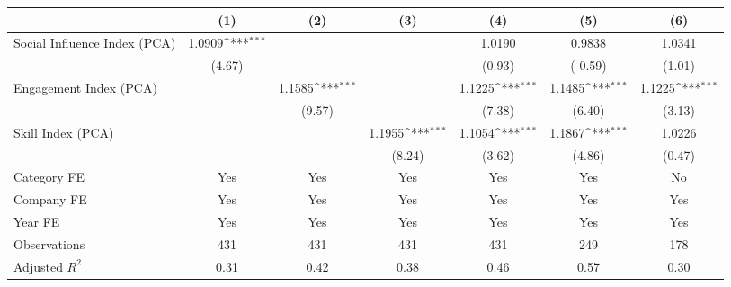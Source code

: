 {
\def\sym#1{\ifmmode^{#1}\else\(^{#1}\)\fi}
\begin{tabular}{l*{6}{c}}
\hline\hline
                                   &\multicolumn{1}{c}{(1)}         &\multicolumn{1}{c}{(2)}         &\multicolumn{1}{c}{(3)}         &\multicolumn{1}{c}{(4)}         &\multicolumn{1}{c}{(5)}         &\multicolumn{1}{c}{(6)}         \\
\hline
Social Influence Index (PCA)       &      1.0909\sym{***}&                     &                     &      1.0190         &      0.9838         &      1.0341         \\
                                   &      (4.67)         &                     &                     &      (0.93)         &     (-0.59)         &      (1.01)         \\
[1em]
Engagement Index (PCA)             &                     &      1.1585\sym{***}&                     &      1.1225\sym{***}&      1.1485\sym{***}&      1.1225\sym{***}\\
                                   &                     &      (9.57)         &                     &      (7.38)         &      (6.40)         &      (3.13)         \\
[1em]
Skill Index (PCA)                  &                     &                     &      1.1955\sym{***}&      1.1054\sym{***}&      1.1867\sym{***}&      1.0226         \\
                                   &                     &                     &      (8.24)         &      (3.62)         &      (4.86)         &      (0.47)         \\
[1em]
Category FE                        &         Yes         &         Yes         &         Yes         &         Yes         &         Yes         &          No         \\
[1em]
Company FE                         &         Yes         &         Yes         &         Yes         &         Yes         &         Yes         &         Yes         \\
[1em]
Year FE                            &         Yes         &         Yes         &         Yes         &         Yes         &         Yes         &         Yes         \\
\hline
Observations                       &         431         &         431         &         431         &         431         &         249         &         178         \\
Adjusted \(R^{2}\)                 &        0.31         &        0.42         &        0.38         &        0.46         &        0.57         &        0.30         \\
\hline\hline
\end{tabular}
}
